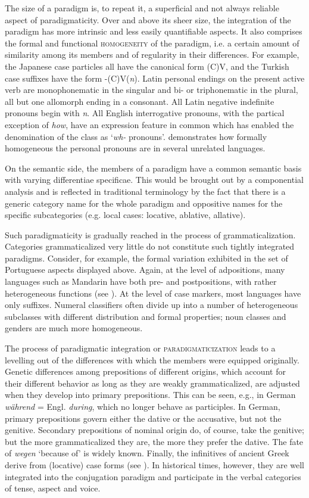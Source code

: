 The size of a paradigm is, to repeat it, a superficial and not always reliable aspect of paradigmaticity. Over and above its sheer size, the integration of the paradigm has more intrinsic and less easily quantifiable aspects. It also comprises the formal and functional \textsc{homogeneity} of the paradigm, i.e. a certain amount of similarity among its members and of regularity in their differences. For example, the Japanese case particles all have the canonical form (C)V, and the Turkish case suffixes have the form -(C)V(\textit{n}). Latin personal endings on the present active verb are monophonematic in the singular and bi- or triphonematic in the plural, all but one allomorph ending in a consonant. All Latin negative indefinite pronouns begin with \textit{n}. All English interrogative pronouns, with the partical exception of \textit{how}, have an expression feature in common which has enabled the denomination of the class as ‘\textit{wh-} pronouns’. \citet[256f]{Bloomfield1933} demonstrates how formally homogeneous the personal pronouns are in several unrelated languages.

On the semantic side, the members of a paradigm have a common semantic basis with varying differentiae specificae. This would be brought out by a componential analysis and is reflected in traditional terminology by the fact that there is a generic category name for the whole paradigm and oppositive names for the specific subcategories (e.g. local cases: locative, ablative, allative).

Such paradigmaticity is gradually reached in the process of grammaticalization. Categories grammaticalized very little do not constitute such tightly integrated paradigms. Consider, for example, the formal variation exhibited in the set of Portuguese aspects displayed above. Again, at the level of adpositions, many languages such as Mandarin have both pre- and postpositions, with rather heterogeneous functions (see \citealt{Hagège1975}). At the level of case markers, most languages have only suffixes. Numeral classifiers often divide up into a number of heterogeneous subclasses with different distribution and formal properties; noun classes and genders are much more homogeneous.

The process of paradigmatic integration or \textsc{paradigmaticization} leads to a levelling out of the differences with which the members were equipped originally. Genetic differences among prepositions of different origins, which account for their different behavior as long as they are weakly grammaticalized, are adjusted when they develop into primary prepositions. This can be seen, e.g., in German \textit{während} = Engl. \textit{during}, which no longer behave as participles. In German, primary prepositions govern either the dative or the accusative, but not the genitive. Secondary prepositions of nominal origin do, of course, take the genitive; but the more grammaticalized they are, the more they prefer the dative. The fate of \textit{wegen} ‘because of’ is widely known. Finally, the infinitives of ancient Greek derive from (locative) case forms (see \citealt[196f, 237--239]{Rix1976}). In historical times, however, they are well integrated into the conjugation paradigm and participate in the verbal categories of tense, aspect and voice.

